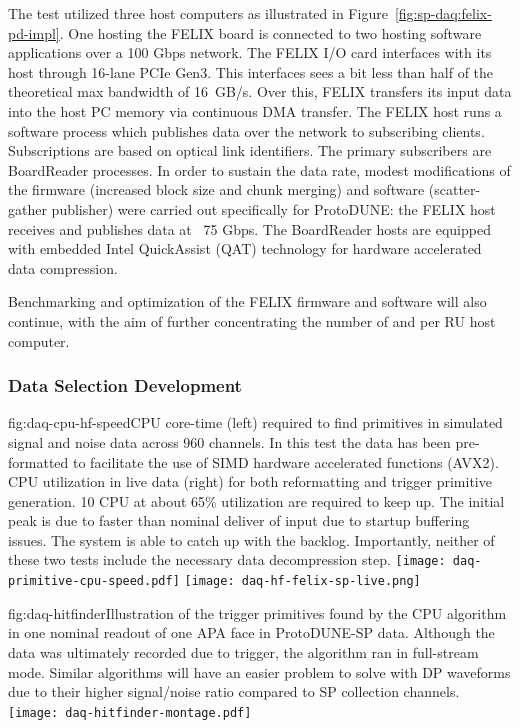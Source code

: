 The test utilized three host computers as illustrated in
Figure~\ref{fig:sp-daq:felix-pd-impl}.
One hosting the FELIX board is connected to two hosting software
applications over a 100 Gbps network.
The FELIX I/O card interfaces with its host through 16-lane PCIe Gen3.
This interfaces sees a bit less than half of the theoretical max
bandwidth of \SI{16}{GB/s}.
Over this, FELIX transfers its input data into the host PC memory via
continuous DMA transfer.
The FELIX host runs a software process which publishes data over the
network to subscribing clients.
Subscriptions are based on optical link identifiers.
The primary subscribers are  BoardReader processes.
In order to sustain the data rate, modest modifications of the firmware
(increased block size and chunk merging) and software (scatter-gather
publisher) were carried out specifically for ProtoDUNE: the FELIX host
receives and publishes data at ~75 Gbps.
The BoardReader hosts are equipped with embedded Intel QuickAssist (QAT)
\cite{qat} technology for hardware accelerated data compression.


Benchmarking and optimization of the FELIX firmware and software will also
continue, with the aim of further concentrating the number of  and
 per RU host computer.


\subsubsection{Data Selection Development}

\begin{dunefigure}{fig:daq-cpu-hf-speed}{CPU core-time (left) required
    to find primitives in simulated signal and noise data across 960
    channels.
    In this test the data has been pre-formatted to facilitate the use
    of SIMD hardware accelerated functions (AVX2). 
    CPU utilization in live data (right) for both reformatting and
    trigger primitive generation. 10 CPU at about 65\% utilization are
    required to keep up. 
    The initial peak is due to faster than nominal deliver of input due
    to startup buffering issues. 
    The system is able to catch up with the backlog.
    Importantly, neither of these two tests include the necessary data
    decompression step.}
  \texttt{[image: daq-primitive-cpu-speed.pdf]}%
  \texttt{[image: daq-hf-felix-sp-live.png]}
\end{dunefigure}

\begin{dunefigure}{fig:daq-hitfinder}{Illustration of the trigger primitives
    found by the CPU algorithm in one nominal readout of one APA face in ProtoDUNE-SP
    data.  Although the data was ultimately recorded due to trigger, the
    algorithm ran in full-stream mode.  Similar algorithms will have an easier
    problem to solve with DP waveforms due to their higher signal/noise ratio
    compared to SP collection channels.}
    \texttt{[image: daq-hitfinder-montage.pdf]}
\end{dunefigure}

